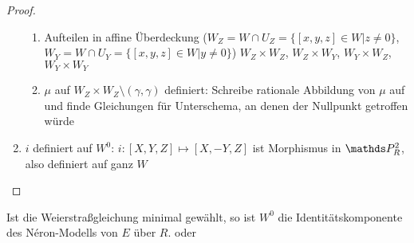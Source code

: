 \documentclass[german]{scrreprt}
\begin{document}
\begin{Lemma}
\begin{proof}
\begin{enumerate}
\begin{enumerate}
      \item Aufteilen in affine Überdeckung
        ($W_Z=W\cap U_Z=\{[x,y,z]\in W| z\neq0\}$,
        $W_Y=W\cap U_Y=\{[x,y,z]\in W| y\neq0\}$)
        $W_Z\times W_Z$, $W_Z\times W_Y$, $W_Y\times W_Z$,
        $W_Y\times W_Y$
      \item $\mu$ auf $W_Z\times W_Z\setminus(\gamma,\gamma)$
        definiert:
        Schreibe rationale Abbildung von $\mu$ auf und finde
        Gleichungen für Unterschema, an denen der Nullpunkt getroffen
        würde
      \end{enumerate}
    \item $i$ definiert auf $W^0$:
      $i\colon [X,Y,Z]\mapsto [X,-Y,Z]$ ist Morphismus in $\P_R^2$,
      also definiert auf ganz $W$
    \end{enumerate}
  \end{proof}
\end{Lemma}
\begin{Bemerkung}
    Ist die Weierstraßgleichung minimal gewählt,
  so ist $W^0$ die Identitätskomponente des Néron-Modells von
  $E$ über $R$.
  \cite[Corollary IV.9.1]{silverman2} oder
  \cite[Chapter 1.5, S.\,23]{neron}
\end{Bemerkung}
\end{document}
